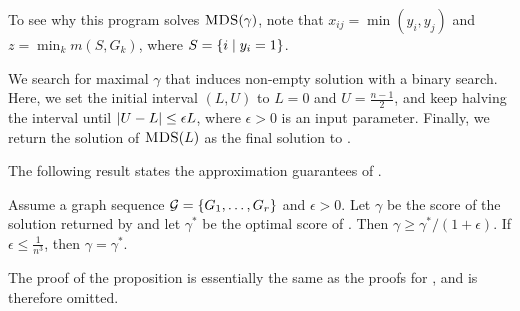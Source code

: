 To see why this program solves $\problemdcs(\gamma)$,
note that $x_{ij} = \min(y_i, y_j)$ and $z = \min_k m(S, G_k)$,
where $S = \left\{i \mid y_i = 1\right\}$.

We search for maximal $\gamma$ that induces non-empty solution
with a binary search. Here, we set the initial interval $(L, U)$ to $L = 0$ and $U =\frac{n - 1}{2}$, and keep halving the interval until ${\left| U - L\right|} \leq  \epsilon L$, where $\epsilon > 0$  is an input parameter. Finally, we return the solution of $\textsc{MDS}(L)$ as the final solution to \problemdcs. 

The following result states the approximation guarantees of \algipdcs.

\begin{proposition}
Assume a graph sequence ${\mathcal G} = \left\{G_1,\dots,G_r\right\}$ and $\epsilon > 0$. 
Let $\gamma$ be the score of the solution returned by \algipdcs and let $\gamma^*$ be the optimal score of \problemdcs. Then $\gamma \geq \gamma^*/(1 + \epsilon)$. If $\epsilon \leq \frac{1}{n^3}$, then $\gamma = \gamma^*$.
\label{prop:opt-dcs-approx}
\end{proposition}

The proof of the proposition is essentially the same as the proofs for \algipcm, and is therefore omitted.

\iffalse
Let $S$ be the solution returned by $\problemdcs(\gamma)$. Here we use a similar set of indicator variables $y_i$s and $x_{ij}$s as defined in the IP linked with $\problemcdcsm(\gamma)$.
In addition, we introduce an extra integer variable denoted by $z$ to keep track of the minimum number of edges induced by the subgraph among snapshots. 

The condition $x_{ij} = \min(i, j)$ is valid in \problemdcs problem 
since we can always increase $x_{ij}$s to reduce the $\min(i, j) - x_{ij}$ to zero which only raises the objective value.
Therefore we do not add additional constraints here in contrast to  \problemcdcsm. 

Our IP is closely related to the LP proposed  by~\citet{jethava2015finding} which is used to approximate the \problemdcs problem. To formulate it as an integer program, 
we apply some discretizing techniques together with the fractional programming approach proposed by \citet{goldberg1984finding} to solve the densest subgraph problem.
On the theoretical
side, we provide an algorithm with an approximation scheme, while
the algorithms~(LP-based and greedy) proposed by \citet{jethava2015finding} and the greedy-like algorithms proposed by \citet{semertzidis2019finding}  do not provide any theoretical approximation guarantees for all inputs.
\fi